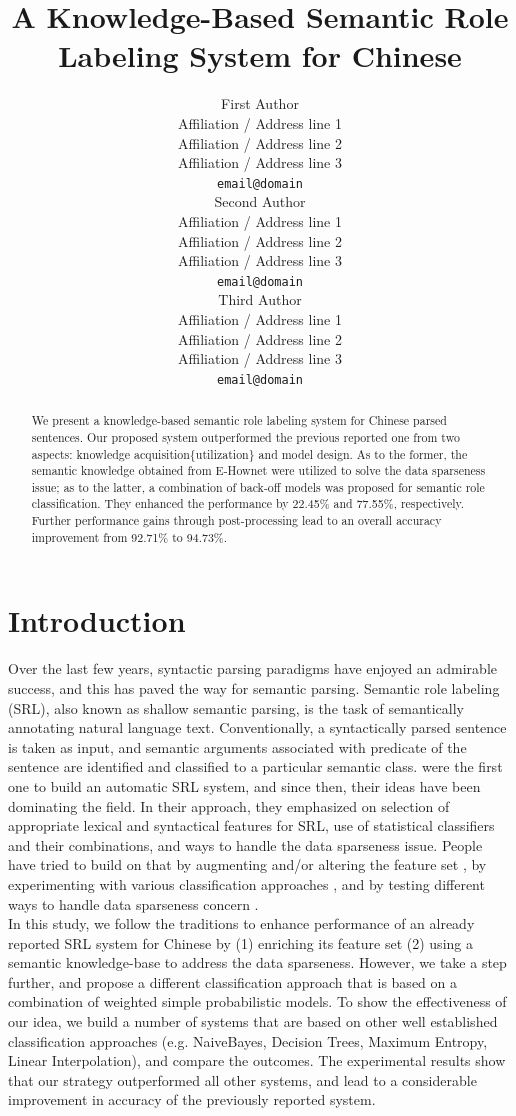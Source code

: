 \documentclass[11pt]{article}
\title{A Knowledge-Based Semantic Role Labeling System for Chinese}
\author{First Author \\
  Affiliation / Address line 1 \\
  Affiliation / Address line 2 \\
  Affiliation / Address line 3 \\
  {\tt email@domain} \\\And
  Second Author \\
  Affiliation / Address line 1 \\
  Affiliation / Address line 2 \\
  Affiliation / Address line 3 \\
  {\tt email@domain} \\\And
    Third Author \\
    Affiliation / Address line 1 \\
    Affiliation / Address line 2 \\
    Affiliation / Address line 3 \\
    {\tt email@domain} \\}
\date{}
\begin{document}
\maketitle
\begin{abstract}
We present a knowledge-based semantic role labeling system for Chinese parsed sentences. Our proposed system outperformed the previous reported one from two aspects: knowledge acquisition\{utilization\} and model design. As to the former, the semantic knowledge obtained from E-Hownet were utilized to solve the data sparseness issue; as to the latter, a combination of back-off models was proposed for semantic role classification. They enhanced the performance by 22.45\% and 77.55\%, respectively. Further performance gains through post-processing lead to an overall accuracy improvement from 92.71\% to 94.73\%.           
\end{abstract}
\section{Introduction}
Over the last few years, syntactic parsing paradigms have enjoyed an admirable success, and this has paved the way for semantic parsing. Semantic role labeling (SRL), also known as shallow semantic parsing, is the task of semantically annotating natural language text. Conventionally, a syntactically parsed sentence is taken as input, and semantic arguments associated with predicate of the sentence are identified and classified to a particular semantic class. \cite{Gildea:2002} were the first one to build an automatic SRL system, and since then, their ideas have been dominating the field. In their approach, they emphasized on selection of appropriate lexical and syntactical features for SRL, use of statistical classifiers and their combinations, and ways to handle the data sparseness issue. People have tried to build on that by augmenting and/or altering the feature set \cite{Chen:2003:UDL:1119355.1119361,Xue04calibratingfeatures}, by experimenting with various classification approaches \cite{Park:2005:MEB:1706543.1706583,tan-wang-2009}, and by testing different ways to handle data sparseness concern \cite{Zapirain:2007:USS:1621474.1621551,Lin:2010:CSR:1909632.1912231}. \\
In this study, we follow the traditions to enhance performance of an already reported SRL system for Chinese \cite{you-chen:2004} by (1) enriching its feature set (2) using a semantic knowledge-base to address the data sparseness. However, we take a step further, and propose a different classification approach that is based on a combination of weighted simple probabilistic models. To show the effectiveness of our idea, we build a number of systems that are based on other well established classification approaches (e.g. NaiveBayes, Decision Trees, Maximum Entropy, Linear Interpolation), and compare the outcomes. The experimental results show that our strategy outperformed all other systems, and lead to a considerable improvement in accuracy of the previously reported system.
\end{document}
